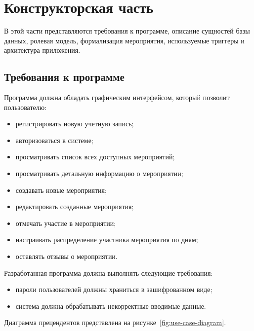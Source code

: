 \chapter{Конструкторская часть}

В этой части представляются требования к программе, описание сущностей базы данных, ролевая модель, формализация мероприятия, используемые триггеры и архитектура приложения.

\section{Требования к программе}

Программа должна обладать графическим интерфейсом, который позволит пользователю:  

\begin{itemize}[label=--]
	\item регистрировать новую учетную запись;  
	\item авторизоваться в системе;  
	\item просматривать список всех доступных мероприятий;  
	\item просматривать детальную информацию о мероприятии;  
	\item создавать новые мероприятия;  
	\item редактировать созданные мероприятия;  
	\item отмечать участие в мероприятии;  
	\item настраивать распределение участника мероприятия по дням;  
	\item оставлять отзывы о мероприятии.  
\end{itemize}  

Разработанная программа должна выполнять следующие требования:  

\begin{itemize}[label=--]
	\item пароли пользователей должны храниться в зашифрованном виде;  
	\item система должна обрабатывать некорректные вводимые данные.
\end{itemize}  

\newpage

Диаграмма прецендентов представлена на рисунке~\ref{fig:use-case-diagram}.

